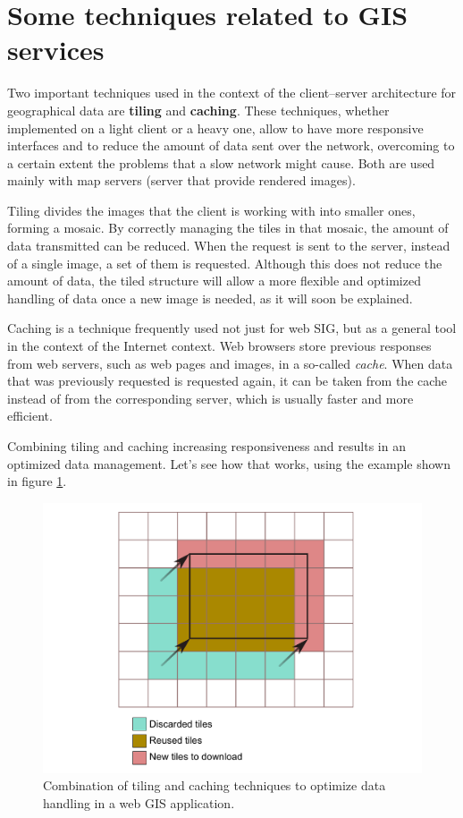 \section{Some techniques related to GIS services}

Two important techniques used in the context of the client--server architecture for geographical data are \textbf{tiling} and \textbf{caching}. These techniques, whether implemented on a light client or a heavy one, allow to have more responsive interfaces and to reduce the amount of data sent over the network, overcoming to a certain extent the problems that a slow network might cause. Both are used mainly with map servers (server that provide rendered images).

Tiling divides the images that the client is working with into smaller ones, forming a mosaic. By correctly managing the tiles in that mosaic, the amount of data transmitted can be reduced. When the request is sent to the server, instead of a single image, a set of them is requested. Although this does not reduce the amount of data, the tiled structure will allow a more flexible and optimized handling of data once a new image is needed, as it will soon be explained.

Caching is a technique frequently used not just for web SIG, but as a general tool in the context of the Internet context. Web browsers store previous responses from web servers, such as web pages and images, in a so-called \emph{cache}. When data that was previously requested is requested again, it can be taken from the cache instead of from the corresponding server, which is usually faster and more efficient.

Combining tiling and caching increasing responsiveness and results in an optimized data management. Let's see how that works, using the example shown in figure \ref{Fig:Tiling}.

\begin{figure}[!hbt]   
\centering
\includegraphics[width=\textwidth]{Software/Tiling.pdf}
\caption{\small Combination of tiling and caching techniques to optimize data handling in a web GIS application.}
\label{Fig:Tiling} 
\end{figure}

